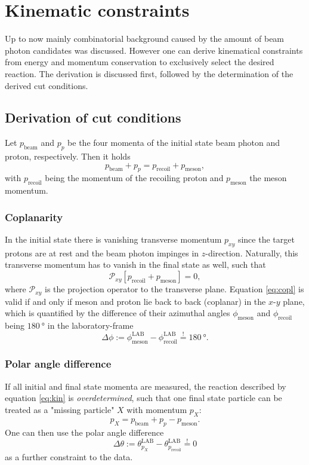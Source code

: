 \section{Kinematic constraints}
Up to now mainly combinatorial background caused by the amount of beam photon candidates was discussed. However one can derive kinematical constraints from energy and momentum conservation to exclusively select the desired reaction. The derivation is discussed first, followed by the determination of the derived cut conditions.
\subsection{Derivation of cut conditions}
Let $p_\text{beam}$ and $p_p$ be the four momenta of the initial state beam photon and proton, respectively. Then it holds \begin{equation}
	p_\text{beam}+p_p=p_\text{recoil}+p_\text{meson},
	\label{eq:kin}
\end{equation}
with $p_\text{recoil}$ being the momentum of the recoiling proton and $p_\text{meson}$ the meson momentum.
\subsubsection{Coplanarity}
In the initial state there is vanishing transverse momentum $p_{xy}$ since the target protons are at rest and the beam photon impinges in $z$-direction. Naturally, this transverse momentum has to vanish in the final state as well, such that \begin{equation}
	\mathcal{P}_{xy} \left[p_\text{recoil}+p_\text{meson}\right]=0,
	\label{eq:copl}
\end{equation}
where $\mathcal{P}_{xy}$ is the projection operator to the transverse plane. Equation \eqref{eq:copl} is valid if and only if meson and proton lie back to back (coplanar) in the $x$-$y$ plane, which is quantified by the difference of their azimuthal angles $\phi_\text{meson}$ and $\phi_\text{recoil}$ being $\SI{180}{\degree}$ in the laboratory-frame
\begin{equation}
	\Delta\phi:=\phi_\text{meson}^\text{LAB}-\phi_\text{recoil}^\text{LAB}\overset{!}{=}\SI{180}{\degree}.
\end{equation}
\subsubsection{Polar angle difference}
If all initial and final state momenta are measured, the reaction described by equation \eqref{eq:kin} is \emph{overdetermined}, such that one final state particle can be treated as a "missing particle" $X$ with momentum $p_X$: 
\begin{equation}
	p_X=p_\text{beam}+p_p-p_\text{meson}.
	\label{eq:polangle}
\end{equation}
One can then use the polar angle difference
\begin{equation}
\Delta\theta:=\theta_{p_X}^\text{LAB}-\theta_{p_\text{recoil}}^\text{LAB}\overset{!}{=}0
\label{eq:polarangle}	
\end{equation}
as a further constraint to the data.
